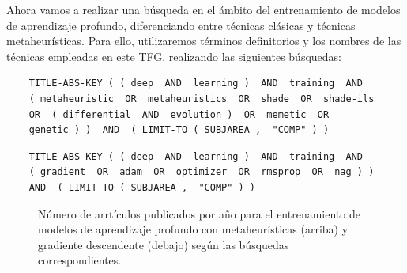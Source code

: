 Ahora vamos a realizar una búsqueda en el ámbito del entrenamiento de modelos de aprendizaje profundo, diferenciando entre técnicas clásicas y técnicas metaheurísticas. Para ello, utilizaremos términos definitorios y los nombres de las técnicas empleadas en este TFG, realizando las siguientes búsquedas:

\begin{verbatim}
	TITLE-ABS-KEY ( ( deep  AND  learning )  AND  training  AND 
	( metaheuristic  OR  metaheuristics  OR  shade  OR  shade-ils 
	OR  ( differential  AND  evolution )  OR  memetic  OR 
	genetic ) )  AND  ( LIMIT-TO ( SUBJAREA ,  "COMP" ) )

\end{verbatim}

\begin{verbatim}
	TITLE-ABS-KEY ( ( deep  AND  learning )  AND  training  AND 
	( gradient  OR  adam  OR  optimizer  OR  rmsprop  OR  nag ) )  
	AND  ( LIMIT-TO ( SUBJAREA ,  "COMP" ) ) 
\end{verbatim}

\begin{figure}[!tbp]
  \centering
  \hfill
  \caption{Número de arrtículos publicados por año para el entrenamiento de modelos de aprendizaje profundo con metaheurísticas (arriba) y gradiente descendente (debajo) según las búsquedas correspondientes.}
  \label{fig:resEdA}
\end{figure}

